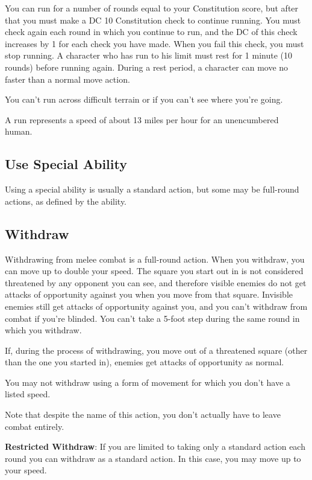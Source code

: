 You can run for a number of rounds equal to your Constitution score, but after that you must make a DC 10 Constitution check to continue running. You must check again each round in which you continue to run, and the DC of this check increases by 1 for each check you have made. When you fail this check, you must stop running. A character who has run to his limit must rest for 1 minute (10 rounds) before running again. During a rest period, a character can move no faster than a normal move action.
				
You can't run across difficult terrain or if you can't see where you're going.
				
A run represents a speed of about 13 miles per hour for an unencumbered human.
				
\subsection{Use Special Ability}

				
Using a special ability is usually a standard action, but some may be full-round actions, as defined by the ability.
				
\subsection{Withdraw}

				
Withdrawing from melee combat is a full-round action. When you withdraw, you can move up to double your speed. The square you start out in is not considered threatened by any opponent you can see, and therefore visible enemies do not get attacks of opportunity against you when you move from that square. Invisible enemies still get attacks of opportunity against you, and you can't withdraw from combat if you're blinded. You can't take a 5-foot step during the same round in which you withdraw.
				
If, during the process of withdrawing, you move out of a threatened square (other than the one you started in), enemies get attacks of opportunity as normal.
				
You may not withdraw using a form of movement for which you don't have a listed speed. 
				
Note that despite the name of this action, you don't actually have to leave combat entirely.
				
\textbf{Restricted Withdraw}: If you are limited to taking only a standard action each round you can withdraw as a standard action. In this case, you may move up to your speed.
				
